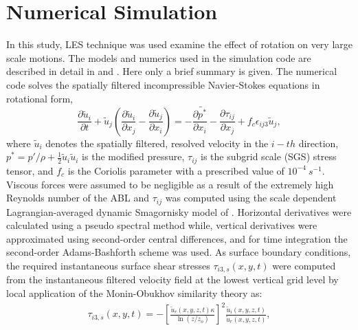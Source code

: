 \documentclass{amsart}
\begin{document}
\section{Numerical Simulation}
In this study, LES technique was used examine the effect of rotation on very large scale motions.  The models and numerics used in the simulation code are described in detail in \citet{stoll_wrr_2006} and \citet{stoll_blm_2008}.  Here only a brief summary is given.  The numerical code solves the spatially filtered incompressible Navier-Stokes equations in rotational form,
\begin{equation}
    \frac{\partial \tilde{u}_i}{\partial t}+ \tilde{u}_j\left(\frac{\partial \tilde{u}_i}{\partial x_{j}} -\frac{\partial \tilde{u}_j}{\partial x_{i}} \right)  = -\frac{\partial \tilde{p^*}}{\partial x_i}-\frac{\partial \tau_{ij}}{\partial x_j}+f_{c}\epsilon_{ij3}\tilde{u}_{j},  
\label{eqn:les_eqn}
\end{equation}
\noindent where $\tilde{u}_i$ denotes the spatially filtered, resolved velocity in the $i-th$ direction, $p^{*}=p'/\rho + \frac{1}{2}\tilde{u}_i\tilde{u}_i$ is the modified pressure, $\tau_{ij}$ is the subgrid scale (SGS) stress tensor, and $f_c$ is the Coriolis parameter with a prescribed value of $10^{-4}\ s^{-1}$.  Viscous forces were assumed to be negligible as a result of the extremely high Reynolds number of the ABL and $\tau_{ij}$ was computed using the scale dependent Lagrangian-averaged dynamic Smagornisky model of \citet{stoll_wrr_2006}. Horizontal derivatives were calculated using a pseudo spectral method while, vertical derivatives were approximated using second-order central differences, and for time integration the second-order Adams-Bashforth scheme was used. As surface boundary conditions, the required instantaneous surface shear stresses $\tau_{i3,s}(x,y,t)$  were computed from the instantaneous filtered velocity field at the lowest vertical grid level by local application of the Monin-Obukhov similarity theory \citep{stoll_blm_2006} as:
\begin{align}
\tau_{i3,s}(x,y,t) = -\left [ \frac{\tilde{u}_r(x,y,z,t)\kappa}{\ln(z/z_o)} \right ]^2\frac{\tilde{u}_i(x,y,z,t)}{\tilde{u}_r(x,y,z,t)}, 
\end{align}
\end{document}
